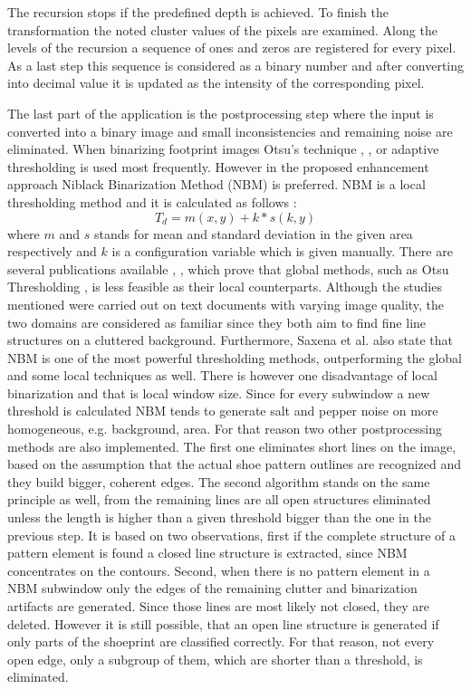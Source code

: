 \documentclass[draft,final]{vutinfth} %
\begin{document}
The recursion stops if the predefined depth is achieved.
To finish the transformation the noted cluster values of the pixels are examined.
Along the levels of the recursion a sequence of ones and zeros are registered for every pixel.
As a last step this sequence is considered as a binary number and after converting into decimal value it is updated as the intensity of the corresponding pixel.
\par
The last part of the application is the postprocessing step where the input is converted into a binary image and small inconsistencies and remaining noise are eliminated.
When binarizing footprint images Otsu's technique \cite{algarni2008novel}, \cite{alizadeh2017automatic}, \cite{wu2019crime} or adaptive thresholding \cite{wang2014automatic} is used most frequently.
However in the proposed enhancement approach Niblack Binarization Method (NBM) \cite{niblack1985introduction} is preferred.
NBM is a local thresholding method and it is calculated as follows \cite{saxena2019niblack}:
\[T_d = m(x,y) + k * s(k, y)\]
where $m$ and $s$ stands for mean and standard deviation in the given area respectively and $k$ is a configuration variable which is given manually. 
There are several publications available \cite{som2011application}, \cite{athimethphat2011review}, which prove that global methods, such as Otsu Thresholding \cite{otsu1979threshold}, is less feasible as their local counterparts.
Although the studies mentioned were carried out on text documents with varying image quality, the two domains are considered as familiar since they both aim to find fine line structures on a cluttered background.
Furthermore, Saxena et al. \cite{saxena2019niblack} also state that NBM is one of the most powerful thresholding methods, outperforming the global and some local techniques as well. 
There is however one disadvantage of local binarization and that is local window size.
Since for every subwindow a new threshold is calculated NBM tends to generate salt and pepper noise on more homogeneous, e.g. background, area.
For that reason two other postprocessing methods are also implemented.
The first one eliminates short lines on the image, based on the assumption that the actual shoe pattern outlines are recognized and they build bigger, coherent edges.
The second algorithm stands on the same principle as well, from the remaining lines are all open structures eliminated unless the length is higher than a given threshold bigger than the one in the previous step.
It is based on two observations, first if the complete structure of a pattern element is found a closed line structure is extracted, since NBM concentrates on the contours.
Second, when there is no pattern element in a NBM subwindow only the edges of the remaining clutter and binarization artifacts are generated.
Since those lines are most likely not closed, they are deleted.
However it is still possible, that an open line structure is generated if only parts of the shoeprint are classified correctly.
For that reason, not every open edge, only a subgroup of them, which are shorter than a threshold, is eliminated.
\end{document}
